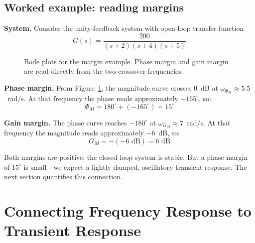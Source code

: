 \documentclass[12pt]{article}
\newcommand{\figplaceholder}[2][3in]{%
  \begin{center}
  \fbox{\parbox{#1}{\centering\vspace{0.5in}\textit{[Figure: #2]}\vspace{0.5in}}}
  \end{center}
}
\begin{document}
\subsection{Worked example: reading margins}
\label{sec:margin_example}

\textbf{System.}  Consider the unity-feedback system with open-loop transfer
function
\begin{equation}
  G(s) = \frac{200}{(s+2)(s+4)(s+5)}
  \label{eq:ex_loop}
\end{equation}

\begin{figure}[htbp]
  \figplaceholder[5.5in]{Bode magnitude and phase plots for $G(s) = 200/[(s+2)(s+4)(s+5)]$.
    Annotate: gain crossover at $\omega_{\Phi_M} \approx 5.5$~rad/s where
    phase reads $-165^\circ$; phase crossover at $\omega_{G_M} \approx 7$~rad/s
    where magnitude reads $-6$~dB.  Mark the resulting $\Phi_M = 15^\circ$
    and $G_M = 6$~dB. [Nise Fig.~10.36 scaled to $K = 200$]}
  \caption{Bode plots for the margin example.  Phase margin and gain margin
    are read directly from the two crossover frequencies.}
  \label{fig:ex_bode}
\end{figure}

\textbf{Phase margin.}  From Figure~\ref{fig:ex_bode}, the magnitude curve
crosses 0~dB at $\omega_{\Phi_M} \approx 5.5$~rad/s.  At that frequency the
phase reads approximately $-165^\circ$, so:
\[
  \Phi_M = 180^\circ + (-165^\circ) = 15^\circ
\]

\textbf{Gain margin.}  The phase curve reaches $-180^\circ$ at
$\omega_{G_M} \approx 7$~rad/s.  At that frequency the magnitude reads
approximately $-6$~dB, so:
\[
  G_M = -(-6\text{ dB}) = 6\text{ dB}
\]

Both margins are positive: the closed-loop system is stable.  But a phase
margin of $15^\circ$ is small---we expect a lightly damped, oscillatory
transient response.  The next section quantifies this connection.

\section{Connecting Frequency Response to Transient Response}
\label{sec:connect}
\end{document}
